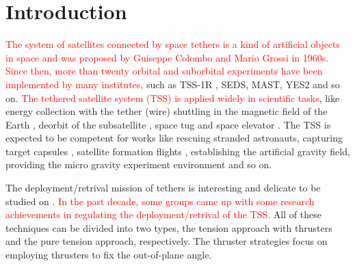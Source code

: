 \documentclass[3p]{elsarticle}
\theoremstyle{plain}
\begin{document}
\section{Introduction}
\textcolor{red}{The system of satellites connected by space tethers is a kind of artificial objects in space and was proposed by Guiseppe Colombo and Mario Grossi in 1960s. Since then, more than twenty orbital and suborbital experiments have been implemented by many institutes,} such as TSS-1R \cite{lanoix2005effect}, SEDS, MAST, YES2 \cite{williams2012review} and so on.
\textcolor{red}{The tethered satellite system (TSS) is applied widely in scientific tasks}, like energy collection with the tether (wire) shuttling in the magnetic field of the Earth \cite{lanoix2005effect}, deorbit of the subsatellite \cite{khan2014analysis}, space tug \cite{wen2016constrained} and space elevator \cite{kojima2015mission}. The TSS is expected to be competent for works like rescuing stranded astronauts, capturing target capsules \cite{huang2015adaptive}, satellite formation flights \cite{hallaj2015tethered,alary2015dynamics}, establishing the artificial gravity field, providing the micro gravity experiment environment \cite{chung2007nonlinear} and so on.\par
The deployment/retrival mission of tethers is interesting and delicate to be studied on \cite{Fujii2012Deployment,steindl2014optimal,cai2014deployment,ma2014coordinated,jung2015nonlinear,li2016libration}.
\textcolor{red}{In the past decade, some groups came up with some research achievements in regulating the deployment/retrival of the TSS.}
All of these techniques can be divided into two types, the tension approach with thrusters and the pure tension approach, respectively. The thruster strategies focus on employing thrusters to fix the out-of-plane angle.
\end{document}
